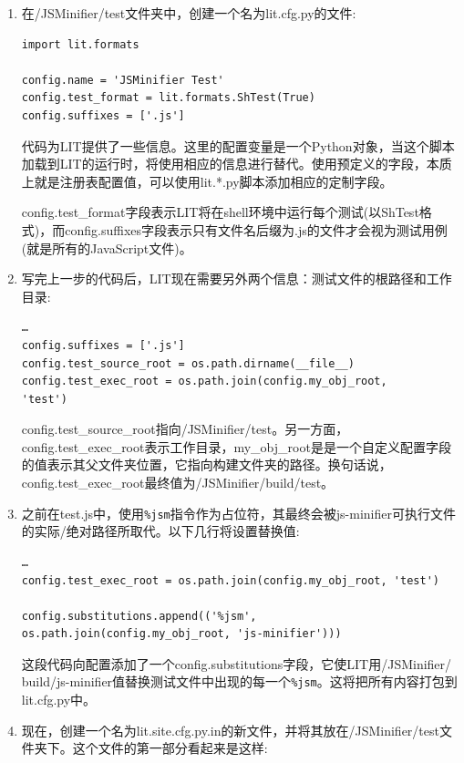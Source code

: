 \begin{enumerate}
\item 在/JSMinifier/test文件夹中，创建一个名为lit.cfg.py的文件:

\begin{lstlisting}[style=stylePython]
import lit.formats

config.name = 'JSMinifier Test'
config.test_format = lit.formats.ShTest(True)
config.suffixes = ['.js']
\end{lstlisting}

代码为LIT提供了一些信息。这里的配置变量是一个Python对象，当这个脚本加载到LIT的运行时，将使用相应的信息进行替代。使用预定义的字段，本质上就是注册表配置值，可以使用lit.*.py脚本添加相应的定制字段。

config.test\_format字段表示LIT将在shell环境中运行每个测试(以ShTest格式)，而config.suffixes字段表示只有文件名后缀为.js的文件才会视为测试用例(就是所有的JavaScript文件)。

\item 写完上一步的代码后，LIT现在需要另外两个信息：测试文件的根路径和工作目录:

\begin{lstlisting}[style=stylePython]
…
config.suffixes = ['.js']
config.test_source_root = os.path.dirname(__file__)
config.test_exec_root = os.path.join(config.my_obj_root,
'test')
\end{lstlisting}

config.test\_source\_root指向/JSMinifier/test。另一方面，config.test\_exec\_root表示工作目录，my\_obj\_root是是一个自定义配置字段的值表示其父文件夹位置，它指向构建文件夹的路径。换句话说，config.test\_exec\_root最终值为/JSMinifier/build/test。

\item 之前在test.js中，使用\texttt{\%jsm}指令作为占位符，其最终会被js-minifier可执行文件的实际/绝对路径所取代。以下几行将设置替换值:

\begin{lstlisting}[style=stylePython]
…
config.test_exec_root = os.path.join(config.my_obj_root, 'test')

config.substitutions.append(('%jsm',
os.path.join(config.my_obj_root, 'js-minifier')))
\end{lstlisting}

这段代码向配置添加了一个config.substitutions字段，它使LIT用/JSMinifier/ build/js-minifier值替换测试文件中出现的每一个\texttt{\%jsm}。这将把所有内容打包到lit.cfg.py中。

\item 现在，创建一个名为lit.site.cfg.py.in的新文件，并将其放在/JSMinifier/test文件夹下。这个文件的第一部分看起来是这样:


\end{enumerate}
